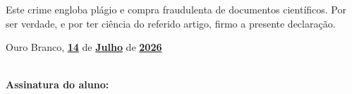 \documentclass[a4paper,12pt]{article}
\begin{document}
Este crime engloba plágio e compra fraudulenta de documentos científicos. Por ser verdade, e por ter ciência do referido artigo, firmo a presente declaração.

\vspace{0.8cm}

Ouro Branco, \underline{\textbf{14}} de \underline{\textbf{Julho}} de \underline{\textbf{2026}}  

\vspace{0.5cm}
\par \hfill \\
\textbf{Assinatura do aluno:} \hrulefill
\end{document}
